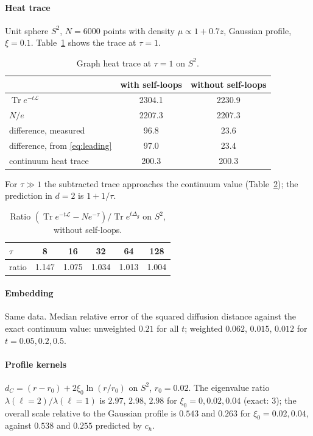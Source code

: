 \documentclass[11pt,a4paper]{article}
\theoremstyle{stmt}
\theoremstyle{defn}
\theoremstyle{rmk}
\numberwithin{equation}{section}
\DeclareMathOperator{\Tr}{Tr}
\newcommand{\Lc}{\mathcal{L}}
\begin{document}
\paragraph{Heat trace} Unit sphere $S^2$, $N=6000$ points with density $\mu\propto1+0.7z$, Gaussian profile, $\xi=0.1$. Table~\ref{tab:tau1} shows the trace at $\tau=1$.

\begin{table}[h]
\centering\small
\caption{Graph heat trace at $\tau=1$ on $S^2$.}\label{tab:tau1}
\begin{tabular}{@{}lcc@{}}
\toprule
 & with self-loops & without self-loops\\
\midrule
$\Tr e^{-t\Lc}$ & 2304.1 & 2230.9\\
$N/e$ & 2207.3 & 2207.3\\
difference, measured & 96.8 & 23.6\\
difference, from \eqref{eq:leading} & 97.0 & 23.4\\
continuum heat trace & 200.3 & 200.3\\
\bottomrule
\end{tabular}
\end{table}

\noindent For $\tau\gg1$ the subtracted trace approaches the continuum value (Table~\ref{tab:ratio}); the prediction in $d=2$ is $1+1/\tau$.

\begin{table}[h]
\centering\small
\caption{Ratio $(\Tr e^{-t\Lc}-Ne^{-\tau})/\Tr e^{t\Delta_g}$ on $S^2$, without self-loops.}\label{tab:ratio}
\begin{tabular}{@{}lccccc@{}}
\toprule
$\tau$ & 8 & 16 & 32 & 64 & 128\\
\midrule
ratio & 1.147 & 1.075 & 1.034 & 1.013 & 1.004\\
\bottomrule
\end{tabular}
\end{table}

\paragraph{Embedding} Same data. Median relative error of the squared diffusion distance against the exact continuum value: unweighted $0.21$ for all $t$; weighted $0.062$, $0.015$, $0.012$ for $t=0.05,0.2,0.5$.

\paragraph{Profile kernels} $d_C=(r-r_0)+2\xi_0\ln(r/r_0)$ on $S^2$, $r_0=0.02$. The eigenvalue ratio $\lambda(\ell{=}2)/\lambda(\ell{=}1)$ is $2.97$, $2.98$, $2.98$ for $\xi_0=0,0.02,0.04$ (exact: $3$); the overall scale relative to the Gaussian profile is $0.543$ and $0.263$ for $\xi_0=0.02,0.04$, against $0.538$ and $0.255$ predicted by $c_h$.
\end{document}
